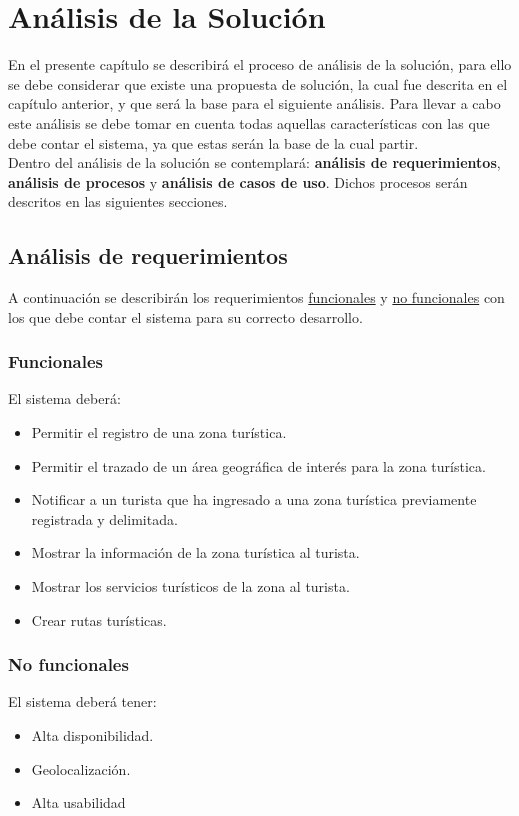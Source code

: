 \hypertarget{cv:analisisSolucion}{
	\chapter{Análisis de la Solución}
}

En el presente capítulo se describirá el proceso de análisis de la solución, para ello se debe considerar que existe una propuesta de solución, la cual fue descrita en el capítulo anterior, y que será la base para el siguiente análisis. Para llevar a cabo este análisis se debe tomar en cuenta todas aquellas características con las que debe contar el sistema, ya que estas serán la base de la cual partir. \\ 

Dentro del análisis de la solución se contemplará: \textbf{análisis de requerimientos}, \textbf{análisis de procesos} y \textbf{análisis de casos de uso}. Dichos procesos serán descritos en las siguientes secciones.

\section{Análisis de requerimientos}
A continuación se describirán los requerimientos \hyperlink{cv:funcionales}{funcionales} y \hyperlink{cv:noFuncionales}{no funcionales} con los que debe contar el sistema para su correcto desarrollo.

\hypertarget{cv:funcionales}{\subsection{Funcionales}}

El sistema deberá:

\begin{itemize}
	\item Permitir el registro de una zona turística.
	\item Permitir el trazado de un área geográfica de interés para la zona turística.
	\item Notificar a un turista que ha ingresado a una zona turística previamente registrada y delimitada.
	\item Mostrar la información de la zona turística al turista.
	\item Mostrar los servicios turísticos de la zona al turista.
	\item Crear rutas turísticas.
\end{itemize}

\hypertarget{cv:noFuncionales}{\subsection{No funcionales}}

El sistema deberá tener: 

\begin{itemize}
	\item Alta disponibilidad.
	\item Geolocalización.
	\item Alta usabilidad
\end{itemize}